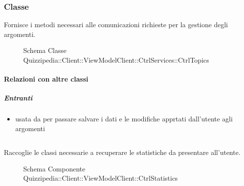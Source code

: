\subsubsection{Classe }
Fornisce i metodi necessari alle comunicazioni richieste per la gestione degli argomenti.
\begin{figure}[H]
\centering
\noindent{}
\caption[Schema Classe CtrlTopics]{Schema Classe Quizzipedia::Client::ViewModelClient::CtrlServices::CtrlTopics}
\end{figure}
\paragraph{Relazioni con altre classi}
\subparagraph{Entranti}
\begin{itemize}
\item usata da  per passare salvare i dati e le modifiche apprtati dall'utente agli argomenti
\end{itemize}
\subsection{}
Raccoglie le classi necessarie a recuperare le statistiche da presentare all'utente.
\begin{figure}[H]
\centering
\noindent{}
\caption[Schema Componente Quizzipedia::Client::ViewModelClient::CtrlStatistics]{Schema Componente Quizzipedia::Client::ViewModelClient::CtrlStatistics}
\end{figure}
